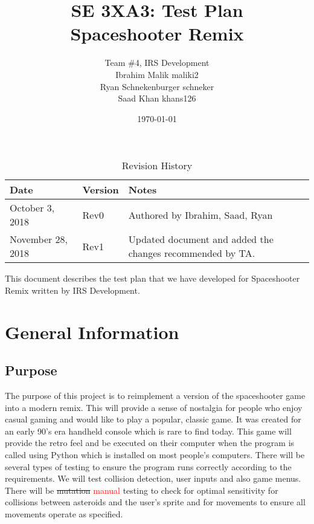 \documentclass[12pt, titlepage]{article}
\title{SE 3XA3: Test Plan\\Spaceshooter Remix}
\author{Team \#4, IRS Development
        \\ Ibrahim Malik maliki2
        \\ Ryan Schnekenburger schneker
        \\ Saad Khan khans126
}
\date{\today}
\begin{document}
\maketitle

\tableofcontents
\listoftables
\listoffigures

\newpage

\begin{table}[hp]
\caption{Revision History} \label{TblRevisionHistory}
\begin{tabularx}{\textwidth}{llX}
\toprule {\bf Date} & {\bf Version} & {\bf Notes}\\
\midrule
October 3, 2018 & Rev0 & Authored by Ibrahim, Saad, Ryan\\
November 28, 2018 & Rev1 & Updated document and added the changes recommended by TA.\\
\bottomrule
\end{tabularx}
\end{table}

\newpage


\noindent This document describes the test plan that we have developed for Spaceshooter Remix written by IRS Development.

\section{General Information}

\subsection{Purpose}
The purpose of this project is to reimplement a version of the spaceshooter game into a modern remix. This will provide a sense of nostalgia for people who enjoy casual gaming and would like to play a popular, classic game. It was created for an early 90's era handheld console which is rare to find today. This game will provide the retro feel and be executed on their computer when the program is called using Python which is installed on most people's computers. There will be several types of testing to ensure the program runs correctly according to the requirements. We will test collision detection, user inputs and also game menus. There will be \sout{mutation} \textcolor{red}{manual} testing to check for optimal sensitivity for collisions between asteroids and the user's sprite and for movements to ensure all movements operate as specified. 
\end{document}
